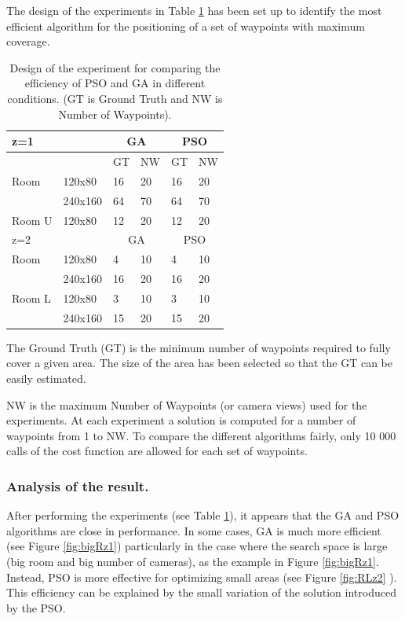 The design of the experiments in Table \ref{table:table1} has been set up to identify the most efficient algorithm for the positioning of a set of waypoints with maximum coverage. 

\begin{table}[!htb]
\begin{tabular}{|l|l|l|l|l|l|}
  \hline
  \multicolumn{2}{|l|}{z=1 } &\multicolumn{2}{|c|}{GA}  & \multicolumn{2}{|c|}{PSO} \\  \hline
  \multicolumn{2}{|c|}{ } & GT & NW & GT & NW\\ \hline
  Room &  120x80 & 16 &20 & 16 & 20\\ \cline{2-6}
     &  240x160 & 64 &70 & 64 & 70 \\ \hline
  Room U &  120x80 & 12 &20 & 12 & 20\\ \hline
  \multicolumn{2}{|l|}{z=2 } &\multicolumn{2}{|c|}{GA}  & \multicolumn{2}{|c|}{PSO} \\  \hline
 Room &  120x80 & 4 &10 & 4 & 10\\ \cline{2-6}
     &  240x160 & 16 &20 & 16 & 20 \\ \hline
 Room L&  120x80 & 3 &10 & 3 & 10\\ \cline{2-6}
     &  240x160 & 15 &20 & 15 & 20 \\ \hline
\end{tabular}
\caption{Design of the experiment for comparing the efficiency of PSO and GA in different conditions.  (GT is Ground Truth and NW is Number of Waypoints).}\label{table:table1}
\end{table}

The Ground Truth (GT) is the minimum number of waypoints required to fully cover a given area. The size of the area has been selected so that the GT can be easily estimated. 

NW is the maximum Number of Waypoints (or camera views) used for the experiments.  
At each experiment a solution is computed for a number of waypoints from 1  to NW. To compare the different algorithms fairly, only 10 000 calls of the cost function are allowed for each set of waypoints.\\

\subsubsection{ Analysis of the result.}

After performing the experiments (see Table \ref{table:table1}), it appears that the GA and PSO algorithms are close in performance. In some cases, GA is much more efficient (see Figure \ref{fig:bigRz1}) particularly in the case where the search space is large (big room and big number of cameras),  as the example in Figure \ref{fig:bigRz1}. Instead, PSO is more effective for optimizing small areas (see Figure \ref{fig:RLz2} ).
This efficiency can be explained by the small variation of the solution introduced by the PSO. 

